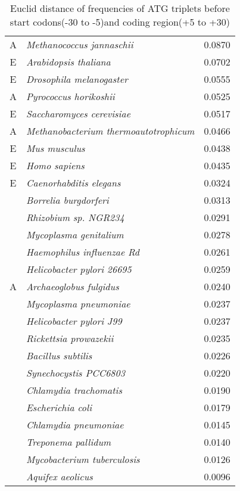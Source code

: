 \begin{table}
\begin{center}
\begin{tabular}{|c|l|r|}
A& {\it Methanococcus jannaschii   } & 0.0870 \\
E& {\it Arabidopsis thaliana   } & 0.0702 \\
E& {\it Drosophila melanogaster   } & 0.0555 \\
A& {\it Pyrococcus horikoshii   } & 0.0525 \\
E& {\it Saccharomyces cerevisiae   } & 0.0517 \\
A& {\it Methanobacterium thermoautotrophicum   } & 0.0466 \\
E& {\it Mus musculus   } & 0.0438 \\
E& {\it Homo sapiens   } & 0.0435 \\
E& {\it Caenorhabditis elegans   } & 0.0324 \\
& {\it Borrelia burgdorferi   } & 0.0313 \\
& {\it Rhizobium sp. NGR234  } & 0.0291 \\
& {\it Mycoplasma genitalium   } & 0.0278 \\
& {\it Haemophilus influenzae Rd  } & 0.0261 \\
& {\it Helicobacter pylori 26695  } & 0.0259 \\
A& {\it Archaeoglobus fulgidus   } & 0.0240 \\
& {\it Mycoplasma pneumoniae   } & 0.0237 \\
& {\it Helicobacter pylori J99  } & 0.0237 \\
& {\it Rickettsia prowazekii   } & 0.0235 \\
& {\it Bacillus subtilis   } & 0.0226 \\
& {\it Synechocystis PCC6803   } & 0.0220 \\
& {\it Chlamydia trachomatis   } & 0.0190 \\
& {\it Escherichia coli   } & 0.0179 \\
& {\it Chlamydia pneumoniae   } & 0.0145 \\
& {\it Treponema pallidum   } & 0.0140 \\
& {\it Mycobacterium tuberculosis   } & 0.0126 \\
& {\it Aquifex aeolicus   } & 0.0096 \\
\end{tabular}
\end{center}
\caption{Euclid distance of frequencies of ATG triplets before start codons(-30 to -5)and coding region(+5 to +30)}
\label{eucdist_atg}
\end{table}

